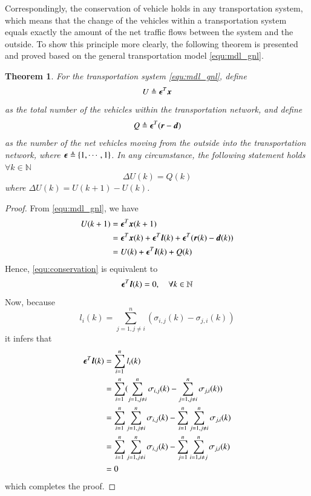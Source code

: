 \documentclass[preprint,authoryear,12pt]{elsarticle}
\renewcommand{\vec}[1]{\mbox{\boldmath$#1$}}
\newtheorem{thm}{Theorem}
\begin{document}
Correspondingly, the conservation of vehicle holds in any
transportation system, which means that the change of the vehicles
within a transportation system equals exactly the amount of the net
traffic flows between the system and the outside. To show this
principle more clearly, the following theorem is presented and proved
based on the general transportation model \eqref{equ:mdl_gnl}.

\begin{thm}\label{thm:conservation}
For the transportation system \eqref{equ:mdl_gnl}, define
\begin{equation}\label{equ:total_vehicle}
U \triangleq \vec{\epsilon}^T\vec{x}
\end{equation}
as the total number of the vehicles within the transportation
network, and define
\begin{equation}\label{equ:all_io}
Q \triangleq \vec{\epsilon}^T(\vec{r}-\vec{d})
\end{equation}
as the number of the net vehicles moving from the outside into the
transportation network, where $\vec{\epsilon} \triangleq
\{1,\cdots,1\}$. In any circumstance, the following statement holds
$\forall k\in\mathbb{N}$
\begin{equation}\label{equ:conservation}
\Delta U(k) = Q(k)
\end{equation}
where $\Delta U(k)=U(k+1)-U(k)$.
\end{thm}
\begin{proof}
From \eqref{equ:mdl_gnl}, we have
\begin{align*}
U(k+1) &= \vec{\epsilon}^T\vec{x}(k+1)\\
       &=
\vec{\epsilon}^T\vec{x}(k)+\vec{\epsilon}^T\vec{l}(k)+\vec{\epsilon}
^T(\vec{r}(k)-\vec{d}(k))\\
       &= U(k)+\vec{\epsilon}^T\vec{l}(k)+Q(k)
\end{align*}
Hence, \eqref{equ:conservation} is equivalent to
$$\vec{\epsilon}^T\vec{l}(k)=0,\quad \forall k\in\mathbb{N}$$
Now, because
$$l_i(k)=\sum_{j=1,j\neq i}^{n}(\sigma_{i,j}(k)-\sigma_{j,i}(k))$$
it infers that
\begin{align*}
\vec{\epsilon}^T\vec{l}(k) &= \sum_{i=1}^n l_i(k)\\
    &= \sum_{i=1}^n (\sum_{j=1,j\neq i}^{n} \sigma_{i,j}(k)
       -\sum_{j=1,j\neq i}^{n} \sigma_{j,i}(k))\\
    &= \sum_{i=1}^n \sum_{j=1,j\neq i}^{n} \sigma_{i,j}(k)
       -\sum_{i=1}^n \sum_{j=1,j\neq i}^{n} \sigma_{j,i}(k)\\
    &= \sum_{i=1}^n \sum_{j=1,j\neq i}^{n} \sigma_{i,j}(k)
       -\sum_{j=1}^n \sum_{i=1,i\neq j}^{n} \sigma_{j,i}(k)\\
    &= 0
\end{align*}
which completes the proof.
\end{proof}
\end{document}
